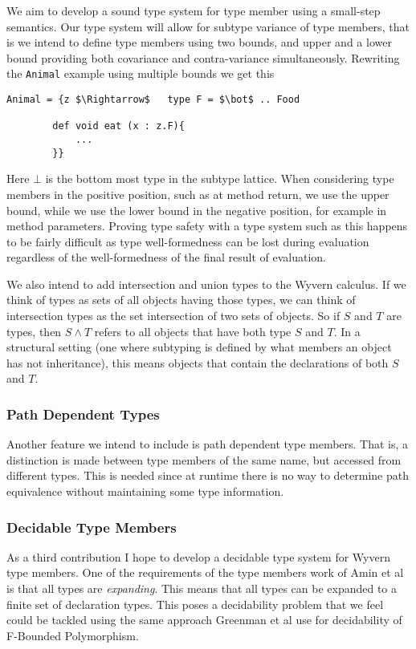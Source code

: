\documentclass[11pt
              , a4paper
              , twoside
              , openright
              ]{report}
\numberwithin{case}{theorem}
\numberwithin{subcase}{case}
\begin{document}
We aim to develop a sound type system for type member using a small-step semantics. Our type system will allow for subtype variance of type members, that is we intend to define type members using two bounds, and upper and a lower bound providing both covariance and contra-variance simultaneously. Rewriting the \verb|Animal| example using multiple bounds we get this
\begin{lstlisting}[mathescape, style=customlang]
Animal = {z $\Rightarrow$	type F = $\bot$ .. Food
		
		def void eat (x : z.F){
			...
		}}
\end{lstlisting}
Here $\bot$ is the bottom most type in the subtype lattice. When considering type members in the positive position, such as at method return, we use the upper bound, while we use the lower bound in the negative position, for example in method parameters. Proving type safety with a type system such as this happens to be fairly difficult as type well-formedness can be lost during evaluation regardless of the well-formedness of the final result of evaluation.

We also intend to add intersection and union types to the Wyvern calculus. If we think of types as sets of all objects having those types, we can think of intersection types as the set intersection of two sets of objects. So if $S$ and $T$ are types, then $S \wedge T$ refers to all objects that have both type $S$ and $T$. In a structural setting (one where subtyping is defined by what members an object has not inheritance), this means objects that contain the declarations of both $S$ and $T$.


\subsubsection{Path Dependent Types}

Another feature we intend to include is path dependent type members. That is, a distinction is made between type members of the same name, but accessed from different types. This is needed since at runtime there is no way to determine path equivalence without maintaining some type information.

\subsubsection{Decidable Type Members}

As a third contribution I hope to develop a decidable type system for Wyvern type members. One of the requirements of the type members work of Amin et al \cite{amin:fool:2012} is that all types are \emph{expanding}. This means that all types can be expanded to a finite set of declaration types. This poses a decidability problem that we feel could be tackled using the same approach Greenman et al \cite{Greenman:2014:GFP:2594291.2594308} use for decidability of F-Bounded Polymorphism.
\end{document}
